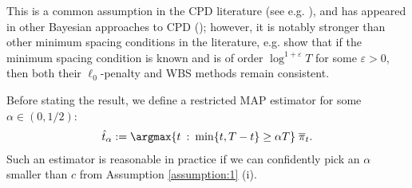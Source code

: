 This is a common assumption in the CPD literature (see e.g. \citealp{Csörgö97, Bai10}), and has appeared in other Bayesian approaches to CPD (\citealp{Cappello21, Cappello22}); however, it is notably stronger than other minimum spacing conditions in the literature, e.g. \cite{Wang2020_localization} show that if the minimum spacing condition is known and is of order $\log^{1+\varepsilon} T$ for some $\varepsilon > 0$, then both their $\ell_0$-penalty and WBS methods remain consistent.

Before stating the result, we define a restricted MAP estimator for some $\alpha \in (0,1/2)$:
\begin{align}
    \label{eq:restricted-map}
        \hat{t}_{\alpha} := \argmax{t \::\: \min\{t, T-t\} \geq \alpha T} \; \overline{\pi}_t.
\end{align}
Such an estimator is reasonable in practice if we can confidently pick an $\alpha$ smaller than $c$ from Assumption \ref{assumption:1} (i). 
